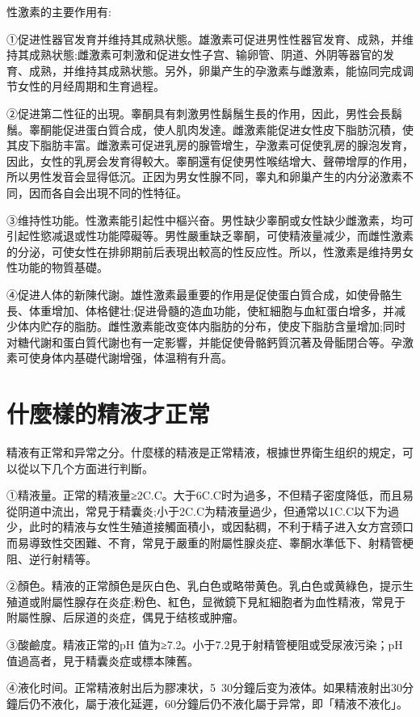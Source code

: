 \documentclass[12pt,UTF8]{ctexbook}
\begin{document}
性激素的主要作用有:

①促进性器官发育并维持其成熟状態。雄激素可促进男性性器官发育、成熟，并维持其成熟状態;雌激素可刺激和促进女性子宫、输卵管、阴道、外阴等器官的发育、成熟，并维持其成熟状態。另外，卵巢产生的孕激素与雌激素，能協同完成调节女性的月经周期和生育過程。

②促进第二性征的出現。睾酮具有刺激男性鬍鬚生長的作用，因此，男性会長鬍鬚。睾酮能促进蛋白質合成，使人肌肉发達。雌激素能促进女性皮下脂肪沉積，使其皮下脂肪丰富。雌激素可促进乳房的腺管增生，孕激素可促使乳房的腺泡发育，因此，女性的乳房会发育得較大。睾酮還有促使男性喉结增大、聲帶增厚的作用，所以男性发音会显得低沉。正因为男女性腺不同，睾丸和卵巢产生的内分泌激素不同，因而各自会出現不同的性特征。

③维持性功能。性激素能引起性中樞兴奋。男性缺少睾酮或女性缺少雌激素，均可引起性慾减退或性功能障礙等。男性嚴重缺乏睾酮，可使精液量减少，而雌性激素的分泌，可使女性在排卵期前后表現出較高的性反应性。所以，性激素是维持男女性功能的物質基礎。

④促进人体的新陳代謝。雄性激素最重要的作用是促使蛋白質合成，如使骨骼生長、体重增加、体格健壮;促进骨髓的造血功能，使紅細胞与血紅蛋白增多，并减少体内贮存的脂肪。雌性激素能改变体内脂肪的分布，使皮下脂肪含量增加;同时对糖代謝和蛋白質代謝也有一定影響，并能促使骨骼鈣質沉著及骨骺閉合等。孕激素可使身体内基礎代謝增强，体温稍有升高。

\section{什麼樣的精液才正常}

精液有正常和异常之分。什麼樣的精液是正常精液，根據世界衛生组织的規定，可以從以下几个方面进行判斷。

①精液量。正常的精液量≥2C.C。大于6C.C时为過多，不但精子密度降低，而且易從阴道中流出，常見于精囊炎;小于2C.C为精液量過少，但通常以1C.C以下为過少，此时的精液与女性生殖道接觸面積小，或因黏稠，不利于精子进入女方宫颈口而易導致性交困難、不育，常見于嚴重的附屬性腺炎症、睾酮水準低下、射精管梗阻、逆行射精等。

②顏色。精液的正常顏色是灰白色、乳白色或略带黄色。乳白色或黄綠色，提示生殖道或附屬性腺存在炎症;粉色、紅色，显微鏡下見紅細胞者为血性精液，常見于附屬性腺、后尿道的炎症，偶見于结核或肿瘤。

③酸鹼度。精液正常的pH 值为≥7.2。小于7.2見于射精管梗阻或受尿液污染；pH值過高者，見于精囊炎症或標本陳舊。

④液化时间。正常精液射出后为膠凍状，5~30分鐘后变为液体。如果精液射出30分鐘后仍不液化，屬于液化延遲，60分鐘后仍不液化屬于异常，即「精液不液化」。
\end{document}
